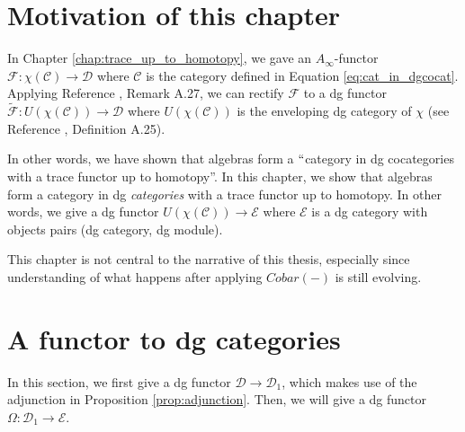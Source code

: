 \section{Motivation of this chapter}
In Chapter \ref{chap:trace_up_to_homotopy}, 
we gave an $A_\infty$-functor 
$\mathcal{F}:\chi(\mathcal{C}) \to
\mathcal{D}$ where $\mathcal{C}$ is 
the category defined in Equation 
\ref{eq:cat_in_dgcocat}. Applying Reference 
\cite{F}, Remark A.27, we can rectify 
$\mathcal{F}$ to a dg functor 
$\tilde{\mathcal{F}}: U(\chi(\mathcal{C})) \to 
\mathcal{D}$ where $U(\chi(\mathcal{C}))$ 
is the enveloping dg category of $\chi$ 
(see Reference \cite{F}, Definition A.25).

In other words, we have shown that algebras 
form a $``$category in dg cocategories with 
a trace functor up to homotopy''. In this 
chapter, we show that algebras form a 
category in dg \textit{categories} with a 
trace functor up to homotopy. In other words, 
we give a dg functor $U(\chi(\mathcal{C})) \to 
\mathcal{E}$ where $\mathcal{E}$ is a 
dg category with objects pairs (dg category, 
dg module).

This chapter is not central to the narrative 
of this thesis, especially since understanding 
of what happens after applying $Cobar(-)$ is 
still evolving.

\section{A functor to dg categories} \label{sec:cobar}
In this section, we first give a 
dg functor $\mathcal{D} \to 
\mathcal{D}_1$, 
which makes use of the adjunction in 
Proposition \ref{prop:adjunction}. Then, 
we will give a dg functor $\Omega: 
\mathcal{D}_1 \to \mathcal{E}$.

